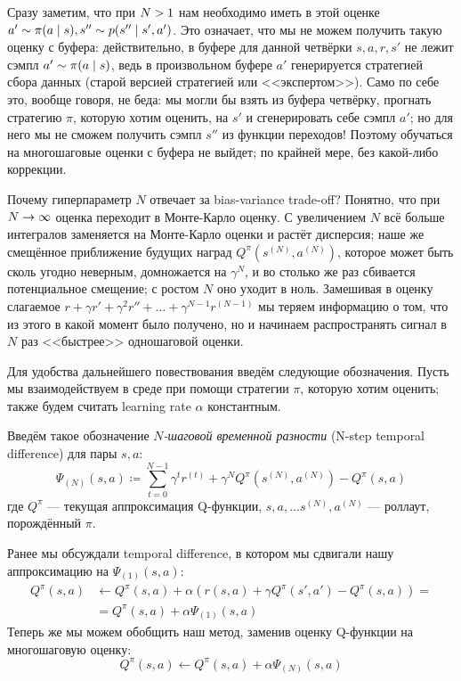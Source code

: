 Сразу заметим, что при $N \HM> 1$ нам необходимо иметь в этой оценке $a' \HM\sim \pi(a \HM\mid s), s'' \HM\sim p(s'' \mid s', a')$. Это означает, что мы не можем получить такую оценку с буфера: действительно, в буфере для данной четвёрки $s, a, r, s'$ не лежит сэмпл $a' \HM\sim \pi(a \HM\mid s)$, ведь в произвольном буфере $a'$ генерируется стратегией сбора данных (старой версией стратегией или <<экспертом>>). Само по себе это, вообще говоря, не беда: мы могли бы взять из буфера четвёрку, прогнать стратегию $\pi$, которую хотим оценить, на $s'$ и сгенерировать себе сэмпл $a'$; но для него мы не сможем получить сэмпл $s''$ из функции переходов! Поэтому обучаться на многошаговые оценки с буфера не выйдет; по крайней мере, без какой-либо коррекции.

Почему гиперпараметр $N$ отвечает за bias-variance trade-off? Понятно, что при $N \HM\to \infty$ оценка переходит в Монте-Карло оценку. С увеличением $N$ всё больше интегралов заменяется на Монте-Карло оценки и растёт дисперсия; наше же смещённое приближение будущих наград $Q^{\pi}(s^{(N)}, a^{(N)})$, которое может быть сколь угодно неверным, домножается на $\gamma^N$, и во столько же раз сбивается потенциальное смещение; с ростом $N$ оно уходит в ноль. Замешивая в оценку слагаемое $r + \gamma r' + \gamma^2 r'' + \dots + \gamma^{N-1} r^{(N-1)}$ мы теряем информацию о том, что из этого в какой момент было получено, но и начинаем распространять сигнал в $N$ раз <<быстрее>> одношаговой оценки.

Для удобства дальнейшего повествования введём следующие обозначения. Пусть мы взаимодействуем в среде при помощи стратегии $\pi$, которую хотим оценить; также будем считать learning rate $\alpha$ константным. 
\begin{definition}
Введём такое обозначение \emph{$N$-шаговой временной разности} (N-step temporal difference) для пары $s, a$:
\begin{equation*}
\Psi_{(N)} (s, a) \coloneqq \sum_{t=0}^{N-1} \gamma^{t} r^{(t)} + \gamma^N Q^\pi(s^{(N)}, a^{(N)}) - Q^\pi(s, a)
\end{equation*}
где $Q^{\pi}$ --- текущая аппроксимация Q-функции, $s, a, \dots s^{(N)}, a^{(N)}$ --- роллаут, порождённый $\pi$.
\end{definition}

Ранее мы обсуждали temporal difference, в котором мы сдвигали нашу аппроксимацию на $\Psi_{(1)}(s, a)$:
\begin{align*}
Q^{\pi}(s, a) &\leftarrow Q^{\pi}(s, a) + \alpha (r(s, a) + \gamma Q^{\pi}(s', a') - Q^{\pi}(s, a)) = \\ &= Q^{\pi}(s, a) + \alpha \Psi_{(1)}(s, a)
\end{align*}
Теперь же мы можем обобщить наш метод, заменив оценку Q-функции на многошаговую оценку:
$$Q^{\pi}(s, a) \leftarrow Q^{\pi}(s, a) + \alpha \Psi_{(N)}(s, a)$$

